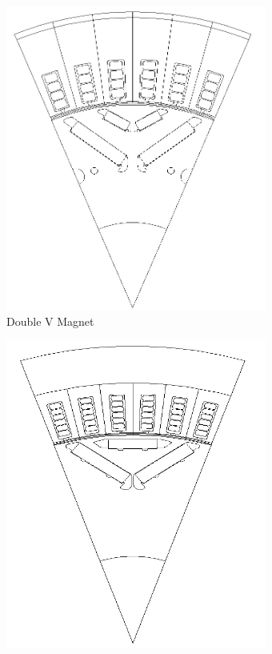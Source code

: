 \documentclass{report} %
\begin{document}
\begin{figure}[H]
\begin{subfigure}{0.32\textwidth}
        \includegraphics[width=\textwidth]{./ReportImages/2V_Magnet.png}
        \caption{Double V Magnet}
        \label{fig:V2 Magnet}
    \end{subfigure}\hfill
    \begin{subfigure}{0.32\textwidth}
        \centering
        \includegraphics[width=\textwidth]{./ReportImages/Nabla_Magnet.png}

\end{subfigure}
\end{figure}
\end{document}
